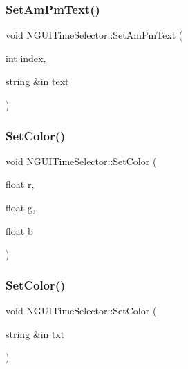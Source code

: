\hypertarget{class_n_g_u_i_time_selector_a3b09f3cfb9f7348c0b7ce1faf1a03625}{}\label{class_n_g_u_i_time_selector_a3b09f3cfb9f7348c0b7ce1faf1a03625} 
\subsubsection{\texorpdfstring{Set\+Am\+Pm\+Text()}{SetAmPmText()}}
{\footnotesize\ttfamily void N\+G\+U\+I\+Time\+Selector\+::\+Set\+Am\+Pm\+Text (\begin{DoxyParamCaption}\item[{int}]{index,  }\item[{string \&in}]{text }\end{DoxyParamCaption})}

\hypertarget{class_n_g_u_i_time_selector_aa3d71ab1afe12a16fe0c1e8b6b476f79}{}\label{class_n_g_u_i_time_selector_aa3d71ab1afe12a16fe0c1e8b6b476f79} 
\subsubsection{\texorpdfstring{Set\+Color()}{SetColor()}\hspace{0.1cm}{\footnotesize\ttfamily [1/2]}}
{\footnotesize\ttfamily void N\+G\+U\+I\+Time\+Selector\+::\+Set\+Color (\begin{DoxyParamCaption}\item[{float}]{r,  }\item[{float}]{g,  }\item[{float}]{b }\end{DoxyParamCaption})}

\hypertarget{class_n_g_u_i_time_selector_aad84241173bf6ce0d56778074d142d96}{}\label{class_n_g_u_i_time_selector_aad84241173bf6ce0d56778074d142d96} 
\subsubsection{\texorpdfstring{Set\+Color()}{SetColor()}\hspace{0.1cm}{\footnotesize\ttfamily [2/2]}}
{\footnotesize\ttfamily void N\+G\+U\+I\+Time\+Selector\+::\+Set\+Color (\begin{DoxyParamCaption}\item[{string \&in}]{txt }\end{DoxyParamCaption})}

